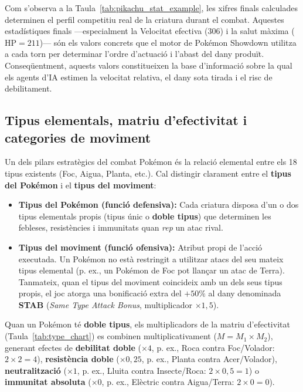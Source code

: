 Com s'observa a la Taula~\ref{tab:pikachu_stat_example}, les xifres finals calculades determinen el perfil competitiu real de la criatura durant el combat. Aquestes estadístiques finals ---especialment la Velocitat efectiva ($306$) i la salut màxima ($\mathrm{HP}=211$)--- són els valors concrets que el motor de Pokémon Showdown utilitza a cada torn per determinar l'ordre d'actuació i l'abast del dany produït. Conseqüentment, aquests valors constitueixen la base d'informació sobre la qual els agents d'IA estimen la velocitat relativa, el dany sota tirada i el risc de debilitament.

\subsection{Tipus elementals, matriu d'efectivitat i categories de moviment}
\label{subsec:tipus}

Un dels pilars estratègics del combat Pokémon és la relació elemental entre els 18 tipus existents (Foc, Aigua, Planta, etc.). Cal distingir clarament entre el \textbf{tipus del Pokémon} i el \textbf{tipus del moviment}:
\begin{itemize}
    \item \textbf{Tipus del Pokémon (funció defensiva):} Cada criatura disposa d'un o dos tipus elementals propis (tipus únic o \textbf{doble tipus}) que determinen les febleses, resistències i immunitats quan \emph{rep} un atac rival.
    \item \textbf{Tipus del moviment (funció ofensiva):} Atribut propi de l'acció executada. Un Pokémon no està restringit a utilitzar atacs del seu mateix tipus elemental (p. ex., un Pokémon de Foc pot llançar un atac de Terra). Tanmateix, quan el tipus del moviment coincideix amb un dels seus tipus propis, el joc atorga una bonificació extra del $+50\%$ al dany denominada \textbf{STAB} (\emph{Same Type Attack Bonus}, multiplicador $\times 1{,}5$).
\end{itemize}

Quan un Pokémon té \textbf{doble tipus}, els multiplicadors de la matriu d'efectivitat (Taula~\ref{tab:type_chart}) es combinen multiplicativament ($M = M_1 \times M_2$), generant efectes de \textbf{debilitat doble} ($\times 4$, p. ex., Roca contra Foc/Volador: $2 \times 2 = 4$), \textbf{resistència doble} ($\times 0{,}25$, p. ex., Planta contra Acer/Volador), \textbf{neutralització} ($\times 1$, p. ex., Lluita contra Insecte/Roca: $2 \times 0{,}5 = 1$) o \textbf{immunitat absoluta} ($\times 0$, p. ex., Elèctric contra Aigua/Terra: $2 \times 0 = 0$).

